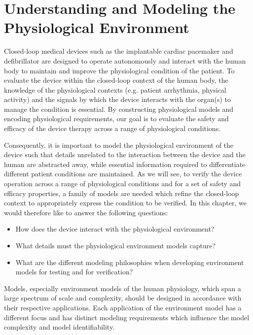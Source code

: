 \chapter{Understanding and Modeling the \\Physiological Environment}

Closed-loop medical devices such as the implantable cardiac pacemaker and defibrillator are designed to operate autonomously and interact with the human body to maintain and improve the physiological condition of the patient. To evaluate the device within the closed-loop context of the human body, the knowledge of the physiological contexts (e.g. patient arrhythmia, physical activity) and the signals by which the device interacts with the organ(s) to manage the condition is essential. By constructing physiological models and encoding physiological requirements, our goal is to evaluate the safety and efficacy of the device therapy across a range of physiological conditions. 

Consequently, it is important to model the physiological environment of the device such that details unrelated to the interaction between the device and the human are abstracted away, while essential information required to differentiate different patient conditions are maintained. As we will see, to verify the device operation across a range of physiological conditions and for a set of safety and efficacy properties, a family of models are needed which refine the closed-loop context to appropriately express the condition to be verified. In this chapter, we would therefore like to answer the following questions:

\begin{itemize}
\vspace{-5pt}
\item How does the device interact with the physiological environment?
\vspace{-5pt}
\item What details must the physiological environment models capture?
\vspace{-5pt}
\item What are the different modeling philosophies when developing environment models for testing and for verification?
\end{itemize}

Models, especially environment models of the human physiology, which span a large spectrum of scale and complexity, should be designed in accordance with their respective applications. Each application of the environment model has a different focus and has distinct modeling requirements which influence the model complexity and model identifiability.

